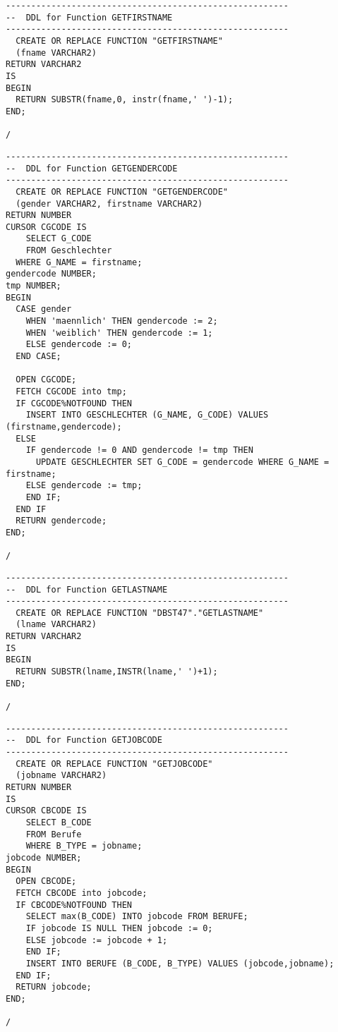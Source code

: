 \documentclass{scrartcl}
\begin{document}
\begin{lstlisting}
--------------------------------------------------------
--  DDL for Function GETFIRSTNAME
--------------------------------------------------------
  CREATE OR REPLACE FUNCTION "GETFIRSTNAME" 
  (fname VARCHAR2)
RETURN VARCHAR2
IS
BEGIN
  RETURN SUBSTR(fname,0, instr(fname,' ')-1);
END;

/
\end{lstlisting}

\begin{lstlisting}
--------------------------------------------------------
--  DDL for Function GETGENDERCODE
--------------------------------------------------------
  CREATE OR REPLACE FUNCTION "GETGENDERCODE" 
  (gender VARCHAR2, firstname VARCHAR2)
RETURN NUMBER
CURSOR CGCODE IS
	SELECT G_CODE
	FROM Geschlechter
  WHERE G_NAME = firstname;
gendercode NUMBER;
tmp NUMBER;
BEGIN
  CASE gender
    WHEN 'maennlich' THEN gendercode := 2;
    WHEN 'weiblich' THEN gendercode := 1;
    ELSE gendercode := 0;
  END CASE;

  OPEN CGCODE;
  FETCH CGCODE into tmp;
  IF CGCODE%NOTFOUND THEN
    INSERT INTO GESCHLECHTER (G_NAME, G_CODE) VALUES (firstname,gendercode);
  ELSE 
    IF gendercode != 0 AND gendercode != tmp THEN
      UPDATE GESCHLECHTER SET G_CODE = gendercode WHERE G_NAME = firstname;
    ELSE gendercode := tmp;
    END IF;
  END IF
  RETURN gendercode;
END;

/
\end{lstlisting}

\begin{lstlisting}
--------------------------------------------------------
--  DDL for Function GETLASTNAME
--------------------------------------------------------
  CREATE OR REPLACE FUNCTION "DBST47"."GETLASTNAME" 
  (lname VARCHAR2)
RETURN VARCHAR2
IS
BEGIN
  RETURN SUBSTR(lname,INSTR(lname,' ')+1);
END;

/
\end{lstlisting}

\begin{lstlisting}
--------------------------------------------------------
--  DDL for Function GETJOBCODE
--------------------------------------------------------
  CREATE OR REPLACE FUNCTION "GETJOBCODE" 
  (jobname VARCHAR2)
RETURN NUMBER
IS
CURSOR CBCODE IS
	SELECT B_CODE
	FROM Berufe
	WHERE B_TYPE = jobname;
jobcode NUMBER;
BEGIN
  OPEN CBCODE;
  FETCH CBCODE into jobcode;
  IF CBCODE%NOTFOUND THEN 
    SELECT max(B_CODE) INTO jobcode FROM BERUFE; 
    IF jobcode IS NULL THEN jobcode := 0;
    ELSE jobcode := jobcode + 1;
    END IF;
    INSERT INTO BERUFE (B_CODE, B_TYPE) VALUES (jobcode,jobname); 
  END IF;
  RETURN jobcode;
END;

/
\end{lstlisting}
\end{document}
